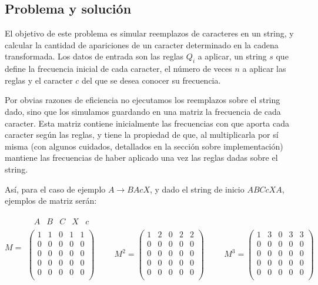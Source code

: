 \subsection*{Problema y solución}

El objetivo de este problema es simular reemplazos de caracteres en un
string, y calcular la cantidad de apariciones de un caracter determinado
en la cadena transformada. Los datos de entrada son las reglas $Q_i$ a aplicar,
un string $s$ que define la frecuencia inicial de cada caracter, el número de
veces $n$ a aplicar las reglas y el caracter $c$ del que se desea conocer su
frecuencia.

Por obvias razones de eficiencia no ejecutamos los reemplazos sobre el
string dado, sino que los simulamos guardando en una matriz la frecuencia
de cada caracter. Esta matriz contiene inicialmente las frecuencias con
que aporta cada caracter según las reglas, y tiene la propiedad de que,
al multiplicarla por sí misma (con algunos cuidados, detallados en la sección
sobre implementación) mantiene las frecuencias de haber aplicado una vez las
reglas dadas sobre el string.

Así, para el caso de ejemplo $A \rightarrow BAcX$, y dado el string de inicio
$ABCcXA$, ejemplos de matriz serán:

$$M =
\begin{array}{l}
\begin{matrix}
	\ \ A & B & C & X & c
\end{matrix} \\
\left(
	\begin{array}{ccccc}
	1 & 1 & 0 & 1 & 1 \\
	0 & 0 & 0 & 0 & 0 \\
	0 & 0 & 0 & 0 & 0 \\
	0 & 0 & 0 & 0 & 0 \\
	0 & 0 & 0 & 0 & 0 \\
	\end{array}
\right)
\hspace{1cm}
M^2 = \left(
\begin{array}{ccccc}
1 & 2 & 0 & 2 & 2 \\
0 & 0 & 0 & 0 & 0 \\
0 & 0 & 0 & 0 & 0 \\
0 & 0 & 0 & 0 & 0 \\
0 & 0 & 0 & 0 & 0 \\
\end{array}
\right)
\hspace{1cm}
M^3 = \left(
\begin{array}{ccccc}
1 & 3 & 0 & 3 & 3 \\
0 & 0 & 0 & 0 & 0 \\
0 & 0 & 0 & 0 & 0 \\
0 & 0 & 0 & 0 & 0 \\
0 & 0 & 0 & 0 & 0 \\
\end{array}
\right)
\end{array}
$$

